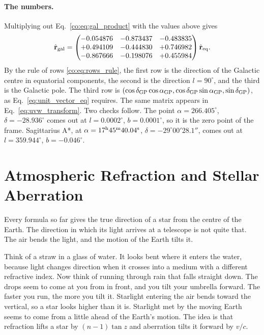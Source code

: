 \paragraph{The numbers.} Multiplying out Eq.~\eqref{co:eq:gal_product} with the values above gives
\begin{equation}
	\hat{\mathbf r}_{\rm gal}=\begin{pmatrix} -0.054876 & -0.873437 & -0.483835 \\ +0.494109 & -0.444830 & +0.746982 \\ -0.867666 & -0.198076 & +0.455984 \end{pmatrix}\hat{\mathbf r}_{\rm eq}.
	\label{co:eq:T_gal}
\end{equation}
By the rule of rows \eqref{co:eq:rows_rule}, the first row is the direction of the Galactic centre in equatorial components, the second is the direction $l=90^\circ$, and the third is the Galactic pole. The third row is $(\cos\delta_{\rm GP}\cos\alpha_{\rm GP},\cos\delta_{\rm GP}\sin\alpha_{\rm GP},\sin\delta_{\rm GP})$, as Eq.~\eqref{eq:unit_vector_eq} requires. The same matrix appears in Eq.~\eqref{eq:uvw_transform}. Two checks follow. The point $\alpha=266.405^\circ$, $\delta=-28.936^\circ$ comes out at $l=0.0002^\circ$, $b=0.0001^\circ$, so it is the zero point of the frame. Sagittarius A*, at $\alpha=17^{\rm h}45^{\rm m}40.04^{\rm s}$, $\delta=-29^\circ00'28.1''$, comes out at $l=359.944^\circ$, $b=-0.046^\circ$.

\section{Atmospheric Refraction and Stellar Aberration}
\label{co:sec:refraction}

Every formula so far gives the true direction of a star from the centre of the Earth. The direction in which its light arrives at a telescope is not quite that. The air bends the light, and the motion of the Earth tilts it.

Think of a straw in a glass of water. It looks bent where it enters the water, because light changes direction when it crosses into a medium with a different refractive index. Now think of running through rain that falls straight down. The drops seem to come at you from in front, and you tilt your umbrella forward. The faster you run, the more you tilt it. Starlight entering the air bends toward the vertical, so a star looks higher than it is. Starlight met by the moving Earth seems to come from a little ahead of the Earth's motion. The idea is that refraction lifts a star by $(n-1)\tan z$ and aberration tilts it forward by $v/c$.

